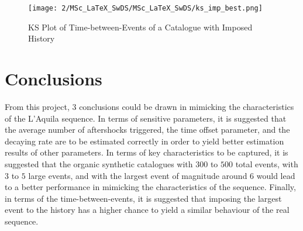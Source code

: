 \documentclass[11pt,twoside]{article}
\numberwithin{Theorem}{section}
\numberwithin{Definition}{section}
\numberwithin{Lemma}{section}
\numberwithin{Algorithm}{section}
\numberwithin{equation}{section}
\begin{document}
\begin{figure}[h]
\centering
\texttt{[image: 2/MSc\_LaTeX\_SwDS/MSc\_LaTeX\_SwDS/ks\_imp\_best.png]}
\caption{KS Plot of Time-between-Events of a Catalogue with Imposed History}
\label{fig:ks_imp}
\end{figure}
\clearpage
\section{Conclusions}

From this project, $3$ conclusions could be drawn in mimicking the characteristics of the L'Aquila sequence. In terms of sensitive parameters, it is suggested that the average number of aftershocks triggered, the time offset parameter, and the decaying rate are to be estimated correctly in order to yield better estimation results of other parameters. In terms of key characteristics to be captured, it is suggested that the organic synthetic catalogues with $300$ to $500$ total events, with $3$ to $5$ large events, and with the largest event of magnitude around $6$ would lead to a better performance in mimicking the characteristics of the sequence. Finally, in terms of the time-between-events, it is suggested that imposing the largest event to the history has a higher chance to yield a similar behaviour of the real sequence.



\clearpage


\clearpage








\end{document}
